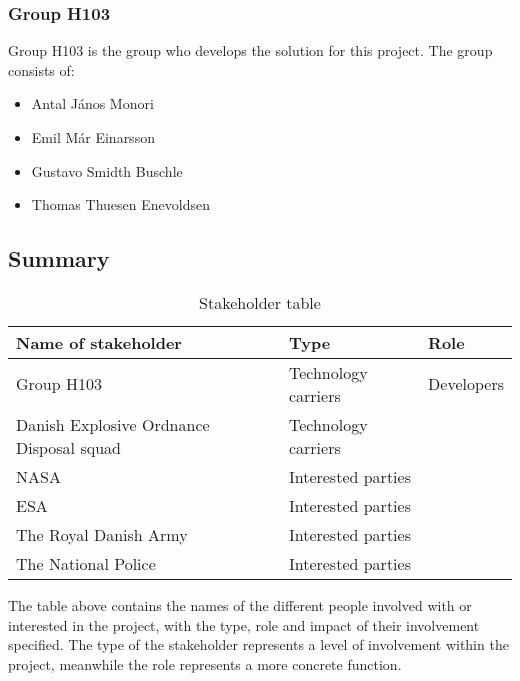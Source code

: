 \subsubsection{Group H103}	
Group H103 is the group who develops the solution for this project. The group consists of:
\begin{itemize}
	\item Antal János Monori
	\item Emil Már Einarsson
	\item Gustavo Smidth Buschle
	\item Thomas Thuesen Enevoldsen
\end{itemize}

\subsection{Summary}
\begin{table}[H]
	\begin{tabular}{ | p{5cm} | l | p{5cm} |}
	   	\hline
	   	\bfseries Name of stakeholder & \bfseries Type & \bfseries Role \\ \hline
	   	Group H103 & Technology carriers & Developers \\ \hline
	   	Danish Explosive Ordnance Disposal squad & Technology carriers &  \\ \hline
 	   	NASA & Interested parties &  \\ \hline
 	   	ESA & Interested parties &  \\ \hline
 	   	The Royal Danish Army & Interested parties & \\ \hline
 	   	The National Police & Interested parties &  \\
	   	\hline
	\end{tabular}
	\caption{Stakeholder table}
	\label{table:stakeholdertable}
\end{table}

The table above contains the names of the different people involved with or interested in the project, with the type, role and impact of their involvement specified. The type of the stakeholder represents a level of involvement within the project, meanwhile the role represents a more concrete function.
